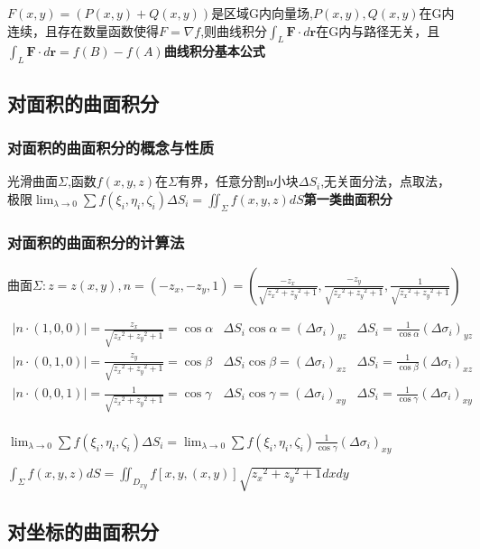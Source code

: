 \documentclass[UTF8]{ctexart}
\newcommand{\mb}[1]{\textbf{#1}}
\newcommand{\mf}[1]{\left( #1\right)}
\newcommand{\mfa}[1]{\left| #1\right|}
\newcommand{\mfc}[1]{\left[ #1 \right]}
\newcommand{\p}{\par}
\newcommand{\ma}[1]{\begin{array}{llll} #1 \end{array}}
\begin{document}
$F\mf{x,y}=\mf{P\mf{x,y}+Q\mf{x,y}}$是区域G内向量场,$P\mf{x,y},Q\mf{x,y}$在G内连续，且存在数量函数使得$F=\nabla f$,则曲线积分$\int_L\mb{F}\cdot d\mb{r}$在G内与路径无关，且$\int_L\mb{F}\cdot d\mb{r}=f\mf{B}-f\mf{A}$\mb{曲线积分基本公式}


\subsection{对面积的曲面积分}

\subsubsection{对面积的曲面积分的概念与性质}


光滑曲面$\Sigma$,函数$f\mf{x,y,z}$在$\Sigma$有界，任意分割n小块$\Delta S_i$,无关面分法，点取法，极限$\lim_{\lambda \rightarrow 0}\sum f\mf{\xi_i,\eta_i,\zeta_i}\Delta S_i=\iint_\Sigma f\mf{x,y,z}dS$\mb{第一类曲面积分}



\subsubsection{对面积的曲面积分的计算法}

曲面$\Sigma : z=z\mf{x,y},n=\mf{-z_x,-z_y,1}=\mf{\frac{-z_x}{\sqrt{{z_x}^2+{z_y}^2+1}},\frac{-z_y}{\sqrt{{z_x}^2+{z_y}^2+1}},\frac{1}{\sqrt{{z_x}^2+{z_y}^2+1}}}$\p

$\ma{
    \mfa{n\cdot \mf{1,0,0}}=\frac{z_x}{\sqrt{{z_x}^2+{z_y}^2+1}}=\cos \alpha &\Delta S_i\cos \alpha=\mf{\Delta \sigma_i}_{yz}  &\Delta S_i=\frac{1}{\cos \alpha} \mf{\Delta \sigma_i}_{yz} \\
    \mfa{n\cdot \mf{0,1,0}}=\frac{z_y}{\sqrt{{z_x}^2+{z_y}^2+1}}=\cos \beta  &\Delta S_i\cos \beta=\mf{\Delta \sigma_i}_{xz}  &\Delta S_i=\frac{1}{\cos \beta} \mf{\Delta \sigma_i}_{xz} \\
    \mfa{n\cdot \mf{0,0,1}}=\frac{1}{\sqrt{{z_x}^2+{z_y}^2+1}}=\cos \gamma &\Delta S_i\cos \gamma=\mf{\Delta \sigma_i}_{xy}  &\Delta S_i=\frac{1}{\cos \gamma}  \mf{\Delta \sigma_i}_{xy}\\
}$


$\lim_{\lambda \rightarrow 0}\sum f\mf{\xi_i,\eta_i,\zeta_i}\Delta S_i=\lim_{\lambda \rightarrow 0}\sum f\mf{\xi_i,\eta_i,\zeta_i}\frac{1}{\cos \gamma}  \mf{\Delta \sigma_i}_{xy}$

$\int_\Sigma f\mf{x,y,z}dS=\iint_{D_{xy}}f\mfc{x,y,\mf{x,y}}\sqrt{{z_x}^2+{z_y}^2+1}dxdy$


\subsection{对坐标的曲面积分}
\end{document}
